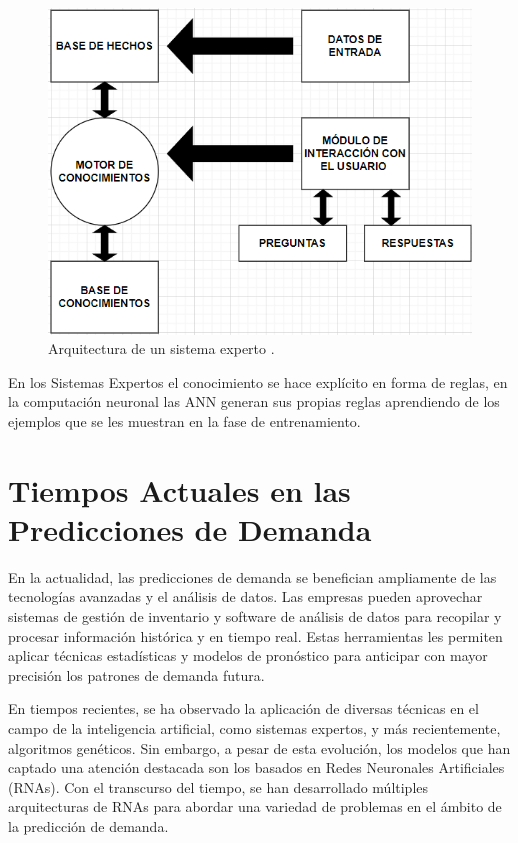 \begin{figure}[H]
  \begin{center}
    \includegraphics[scale=0.60]{./hechos.png}
    \caption{Arquitectura de un sistema experto \cite{diez2001introduccion}.}
    \label{fig:Arquitectura de un sistema experto}
  \end{center}
\end{figure}




En los Sistemas Expertos el conocimiento se hace explícito en forma de reglas, en la computación neuronal las ANN generan sus propias reglas aprendiendo de los ejemplos que se les muestran en la fase de entrenamiento\cite{olabe1998redes}. 



\section{Tiempos Actuales en las Predicciones de Demanda}

En la actualidad, las predicciones de demanda se benefician ampliamente de las tecnologías avanzadas y el análisis de datos. Las empresas pueden aprovechar sistemas de gestión de inventario y software de análisis de datos para recopilar y procesar información histórica y en tiempo real. Estas herramientas les permiten aplicar técnicas estadísticas y modelos de pronóstico para anticipar con mayor precisión los patrones de demanda futura.

En tiempos recientes, se ha observado la aplicación de diversas técnicas en el campo de la inteligencia artificial, como sistemas expertos, y más recientemente, algoritmos genéticos. Sin embargo, a pesar de esta evolución, los modelos que han captado una atención destacada son los basados en Redes Neuronales Artificiales (RNAs). Con el transcurso del tiempo, se han desarrollado múltiples arquitecturas de RNAs para abordar una variedad de problemas en el ámbito de la predicción de demanda.

